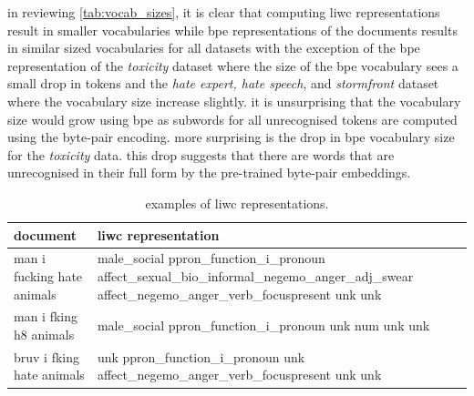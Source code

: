 \begin{table}
  \centering
  \caption{word token and bpe representation.}
  \label{tab:bpe_tok}
\end{table}

in reviewing \cref{tab:vocab_sizes}, it is clear that computing liwc representations result in smaller vocabularies while bpe representations of the documents results in similar sized vocabularies for all datasets with the exception of the bpe representation of the \textit{toxicity} dataset where the size of the bpe vocabulary sees a small drop in tokens and the \textit{hate expert, hate speech}, and \textit{stormfront} dataset where the vocabulary size increase slightly.
it is unsurprising that the vocabulary size would grow using bpe as subwords for all unrecognised tokens are computed using the byte-pair encoding.
more surprising is the drop in bpe vocabulary size for the \textit{toxicity} data.
this drop suggests that there are words that are unrecognised in their full form by the pre-trained byte-pair embeddings.

\begin{table}[]
\centering
\footnotesize
\begin{tabular}{l|p{10.5cm}}
document                   & liwc representation \\ \hline
man i fucking hate animals & male\_social ppron\_function\_i\_pronoun affect\_sexual\_bio\_informal\_negemo\_anger\_adj\_swear affect\_negemo\_anger\_verb\_focuspresent unk unk \\\hline
man i fking h8 animals     & male\_social ppron\_function\_i\_pronoun unk num unk unk \\\hline
bruv i fking hate animals  & unk ppron\_function\_i\_pronoun unk affect\_negemo\_anger\_verb\_focuspresent unk unk
\end{tabular}
\caption{examples of liwc representations.}
\label{tab:liwc_tok}
\end{table}

